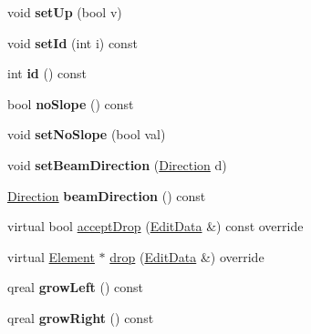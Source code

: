 \begin{DoxyCompactItemize}
\mbox{\label{class_ms_1_1_beam_a4d48f46769c805c57df4bd2f58b05ba3}} 
void {\bfseries set\+Up} (bool v)
\item 
\mbox{\label{class_ms_1_1_beam_ad81b293c630b93a5ac07363cf6fddca3}} 
void {\bfseries set\+Id} (int i) const
\item 
\mbox{\label{class_ms_1_1_beam_a714f182080aba0bb06d1af4aef8a139e}} 
int {\bfseries id} () const
\item 
\mbox{\label{class_ms_1_1_beam_a80b114ecbafa3b0f61ad0baeb596fcd1}} 
bool {\bfseries no\+Slope} () const
\item 
\mbox{\label{class_ms_1_1_beam_a7ac38628e2866eec8a8df67276d0a59c}} 
void {\bfseries set\+No\+Slope} (bool val)
\item 
\mbox{\label{class_ms_1_1_beam_a7d1b66b57e6c27e4d78fbca337fdc1d4}} 
void {\bfseries set\+Beam\+Direction} (\hyperlink{class_ms_1_1_direction}{Direction} d)
\item 
\mbox{\label{class_ms_1_1_beam_a29859123b0faa79b2aba365657d53367}} 
\hyperlink{class_ms_1_1_direction}{Direction} {\bfseries beam\+Direction} () const
\item 
virtual bool \hyperlink{class_ms_1_1_beam_a4ef234c092024c3b6c0c0039ce27c6c9}{accept\+Drop} (\hyperlink{class_ms_1_1_edit_data}{Edit\+Data} \&) const override
\item 
virtual \hyperlink{class_ms_1_1_element}{Element} $\ast$ \hyperlink{class_ms_1_1_beam_adea642fbb6e75bb9f004fe86968a8d03}{drop} (\hyperlink{class_ms_1_1_edit_data}{Edit\+Data} \&) override
\item 
\mbox{\label{class_ms_1_1_beam_a0539b38e2f30312fe1db357a348e84f8}} 
qreal {\bfseries grow\+Left} () const
\item 
\mbox{\label{class_ms_1_1_beam_abf14cb8b89550afb3b2eb5d1e6987c62}} 
qreal {\bfseries grow\+Right} () const
\item 
\mbox{\label{class_ms_1_1_beam_a5864f859ecab0f6e2b639cf7f1212e32}} 

\end{DoxyCompactItemize}
